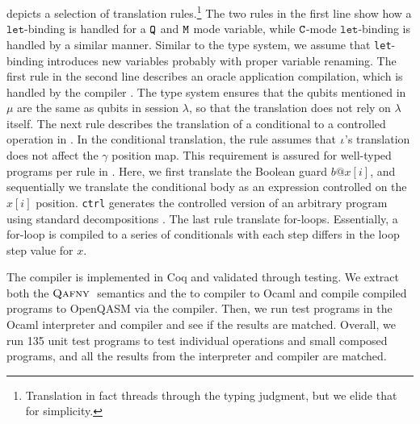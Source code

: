  depicts a selection of translation rules.\footnote{Translation in fact threads through the typing judgment, but we elide that for simplicity.}
The two rules in the first line show how a $\texttt{let}$-binding is handled for a $\texttt{Q}$ and $\texttt{M}$ mode variable, while $\texttt{C}$-mode $\texttt{let}$-binding is handled by a similar manner.
Similar to the type system, we assume that \texttt{let}-binding introduces new variables probably with proper variable renaming.
The first rule in the second line describes an oracle application compilation, which is handled by the \oqasm compiler \cite{oracleoopsla}. The \qafny type system ensures that the qubits mentioned in $\mu$ are the same as qubits in session $\lambda$, so that the translation does not rely on $\lambda$ itself.
The next rule describes the translation of a conditional to a controlled operation in \sqir.
In the conditional translation, the rule assumes that $\iota$'s translation does not affect the $\gamma$ position map.
This requirement is assured for well-typed programs per rule  in .
Here, we first translate the Boolean guard $b@x[i]$, and sequentially we translate the conditional body as an \sqir expression controlled on the $x[i]$ position. \texttt{ctrl} generates the controlled version of an arbitrary \sqir program using standard decompositions \cite[Chapter 4.3]{mike-and-ike}.
The last rule translate \qafny for-loops. Essentially, a for-loop is compiled to a series of conditionals with each step differs in the loop step value for $x$. 

The compiler is implemented in Coq and validated through testing. We extract both the $\textsc{Qafny}\;$ semantics and the \qafny to \sqir compiler to Ocaml and compile compiled \sqir programs to OpenQASM \cite{cross2021openqasm} via the \sqir compiler. Then, we run test programs in the \qafny Ocaml interpreter and compiler and see if the results are matched. Overall, we run 135 unit test programs to test individual operations and small composed programs, and all the results from the \qafny interpreter and compiler are matched.




